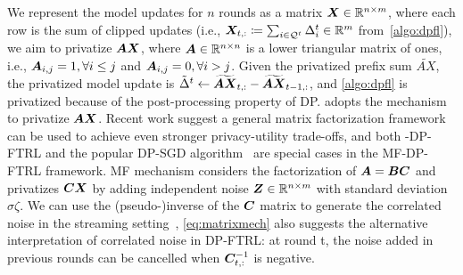 We represent the model updates for $n$ rounds as a matrix ${\bm{X}} \in \mathbb{R}^{n \times m}$, where each row is the sum of clipped updates (i.e., ${\bm{X}}_{t,:} \coloneqq \sum_{i \in \mathcal{Q}^t} \Delta_i^t \in \mathbb{R}^{m}$ from~\cref{algo:dpfl}),
we aim to privatize ${\bm{A}} {\bm{X}}$, where ${\bm{A}} \in \mathbb{R}^{n \times n}$ is a lower triangular matrix of ones, i.e., ${\bm{A}}_{i,j}=1, \forall i\leq j$ and ${\bm{A}}_{i,j}=0, \forall i > j$. Given the privatized prefix sum $\widetilde{AX}$, the privatized model update is $\tilde{\Delta}^t \gets \widetilde{{\bm{A}} {\bm{X}}}_{t,:} - \widetilde{{\bm{A}} {\bm{X}}}_{t-1,:}$, and \cref{algo:dpfl} is privatized because of the post-processing property of DP. \citet{kairouz21practical} adopts the \treeagg{} mechanism to privatize ${\bm{A}} {\bm{X}}$. Recent work suggest a general matrix factorization framework can be used to achieve even stronger privacy-utility trade-offs, and both \treeagg-DP-FTRL and the popular DP-SGD algorithm~\citep{abadi2016deep} are special cases in the MF-DP-FTRL framework. MF mechanism considers the factorization of ${\bm{A}}={\bm{B}} {\bm{C}}$ and privatizes ${\bm{C}} {\bm{X}}$ by adding independent noise ${\bm{Z}} \in \mathbb{R}^{n \times m}$ with standard deviation $\sigma\zeta$.  
We can use the (pseudo-)inverse of the ${\bm{C}}$ matrix to generate the correlated noise in the streaming setting~\citep{choquette2023amplified},
\cref{eq:matrixmech} also suggests the alternative interpretation of correlated noise in DP-FTRL: at round t, the noise added in previous rounds can be cancelled when ${\bm{C}}^{-1}_{t, :}$ is negative.   

